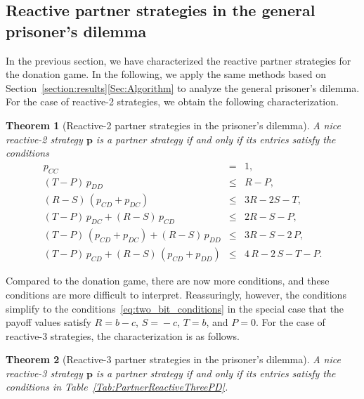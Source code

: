 \documentclass[9pt,twoside,lineno]{pnas-new}
\theoremstyle{plainCl1}
\newtheorem{theorem}{Theorem}
\theoremstyle{plainCl2}
\begin{document}

\subsection{Reactive partner strategies in the general prisoner's dilemma}\label{section:general_prisoners_dilemma}

In the previous section, we have characterized the reactive partner strategies for the donation game. 
In the following, we apply the same methods based on Section~\ref{section:results}\ref{Sec:Algorithm} to analyze the general prisoner's dilemma. 
For  the case of reactive-2 strategies, we obtain the following characterization. 


\begin{theorem}[Reactive-2 partner strategies in the prisoner's dilemma]
\label{theorem:reactive_two_partner_strategies_PD}
A nice reactive-2 strategy $\mathbf{p}$ is a partner strategy if and only if its entries satisfy the conditions
\begin{equation}
  \begin{array}{rcl}
    p_{CC} & = & 1, \\
    (T - P)\, p_{DD} & \le & R - P, \\ 
    (R - S)\, (p_{CD} + p_{DC}) & \le & 3 R - 2 S - T, \\
    (T - P)\, p_{DC}  + (R - S)\, p_{CD} & \le & 2 R - S - P, \\ 
    (T - P)\, (p_{CD} + p_{DC}) + (R - S)\, p_{DD}  & \le & 3 R - S - 2\,P, \\
    (T - P)\, p_{CD}  + (R - S)\, (p_{CD} + p_{DD}) & \le & 4\,R - 2\,S  - T- P.
\end{array}
\end{equation}
\end{theorem}

\noindent
Compared to the donation game, there are now more conditions, and these conditions are more difficult to interpret. Reassuringly, however, the conditions simplify to the conditions~\eqref{eq:two_bit_conditions} in the special case that the payoff values satisfy $R\!=\!b\!-\!c$, $S\!=\!-c$, $T\!=\!b$, and $P\!=\!0$. 
For the case of reactive-3 strategies, the characterization is as follows. 



\begin{theorem}[Reactive-3 partner strategies in the prisoner's dilemma]
\label{theorem:reactive_three_partner_strategies_PD}
A nice reactive-3 strategy $\mathbf{p}$ is a partner strategy if and only if its entries satisfy the conditions in Table~\ref{Tab:PartnerReactiveThreePD}. 
\end{theorem}
\end{document}

